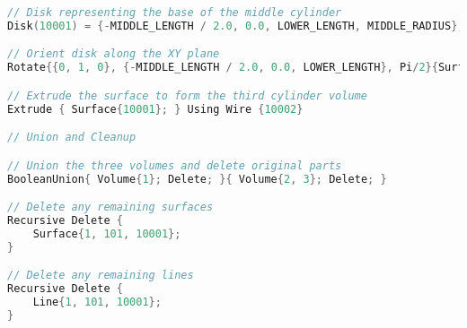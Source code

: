 \begin{lstlisting}[language=C++]
// Disk representing the base of the middle cylinder
Disk(10001) = {-MIDDLE_LENGTH / 2.0, 0.0, LOWER_LENGTH, MIDDLE_RADIUS};

// Orient disk along the XY plane
Rotate{{0, 1, 0}, {-MIDDLE_LENGTH / 2.0, 0.0, LOWER_LENGTH}, Pi/2}{Surface{10001};}

// Extrude the surface to form the third cylinder volume
Extrude { Surface{10001}; } Using Wire {10002}

// Union and Cleanup 

// Union the three volumes and delete original parts
BooleanUnion{ Volume{1}; Delete; }{ Volume{2, 3}; Delete; }

// Delete any remaining surfaces
Recursive Delete {
	Surface{1, 101, 10001};
}

// Delete any remaining lines
Recursive Delete {
	Line{1, 101, 10001};
}
\end{lstlisting}
